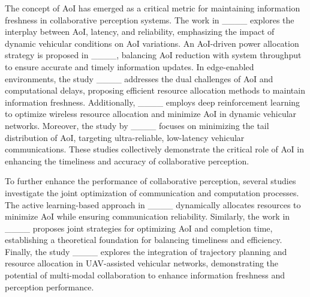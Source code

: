 The concept of AoI has emerged as a critical metric for maintaining information freshness in collaborative perception systems. The work in  ____ explores the interplay between AoI, latency, and reliability, emphasizing the impact of dynamic vehicular conditions on AoI variations. An AoI-driven power allocation strategy is proposed in ____, balancing AoI reduction with system throughput to ensure accurate and timely information updates. In edge-enabled environments, the study ____ addresses the dual challenges of AoI and computational delays, proposing efficient resource allocation methods to maintain information freshness. Additionally, ____ employs deep reinforcement learning to optimize wireless resource allocation and minimize AoI in dynamic vehicular networks.  Moreover, the study by ____ focuses on minimizing the tail distribution of AoI, targeting ultra-reliable, low-latency vehicular communications. These studies collectively demonstrate the critical role of AoI in enhancing the timeliness and accuracy of collaborative perception.


To further enhance the performance of collaborative perception, several studies investigate the joint optimization of communication and computation processes. The active learning-based approach in ____ dynamically allocates resources to minimize AoI while ensuring communication reliability. Similarly, the work in ____ proposes joint strategies for optimizing AoI and completion time, establishing a theoretical foundation for balancing timeliness and efficiency. Finally, the study ____ explores the integration of trajectory planning and resource allocation in UAV-assisted vehicular networks, demonstrating the potential of multi-modal collaboration to enhance information freshness and perception performance.